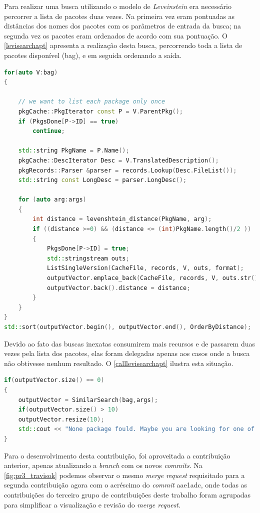 Para realizar uma busca utilizando o modelo de \textit{Leveinstein} era necessário percorrer a lista de pacotes duas vezes. Na primeira vez eram pontuadas as distâncias dos nomes dos pacotes com os parâmetros de entrada da busca; na segunda vez os pacotes eram ordenados de acordo com sua pontuação. O \autoref{levisearchapt} apresenta a realização desta busca, percorrendo toda a lista de pacotes disponível ({\code bag}), e em seguida ordenando a saída.

\begin{lstlisting}[language=C++,label=levisearchapt,caption={Busca ordenada por distância de \textit{Levenshtein}}]
for(auto V:bag)
{

	// we want to list each package only once
	pkgCache::PkgIterator const P = V.ParentPkg();
	if (PkgsDone[P->ID] == true)
		continue;

	std::string PkgName = P.Name();
	pkgCache::DescIterator Desc = V.TranslatedDescription();
	pkgRecords::Parser &parser = records.Lookup(Desc.FileList());
	std::string const LongDesc = parser.LongDesc();

	for (auto arg:args)
	{
		int distance = levenshtein_distance(PkgName, arg);
		if ((distance >=0) && (distance <= (int)PkgName.length()/2 ))
		{
			PkgsDone[P->ID] = true;
			std::stringstream outs;
			ListSingleVersion(CacheFile, records, V, outs, format);
			outputVector.emplace_back(CacheFile, records, V, outs.str());
			outputVector.back().distance = distance;
		}
	}
}
std::sort(outputVector.begin(), outputVector.end(), OrderByDistance);
\end{lstlisting}

Devido ao fato das buscas inexatas consumirem mais recursos e de passarem duas vezes pela lista dos pacotes, elas foram delegadas apenas aos casos onde a busca não obtivesse nenhum resultado. O \autoref{calllevisearchapt} ilustra esta situação.

\begin{lstlisting}[language=C++,label=calllevisearchapt,caption={Chamada seletiva para buscas inexatas}]
if(outputVector.size() == 0)
{
	outputVector = SimilarSearch(bag,args);
	if(outputVector.size() > 10)
	outputVector.resize(10);
	std::cout << "None package fould. Maybe you are looking for one of those:" << std::endl;
}
\end{lstlisting}


Para o desenvolvimento desta contribuição, foi aproveitada a contribuição anterior, apenas atualizando a \textit{branch} com os novos \textit{commits}. Na \autoref{fig:pr3_travisok} podemos observar o mesmo \textit{merge request} requisitado para a segunda contribuição agora com o acréscimo do \textit{commit} {\code aae1adc}, onde todas as contribuições do terceiro grupo de contribuições deste trabalho foram agrupadas para simplificar a visualização e revisão do \textit{merge request}.

